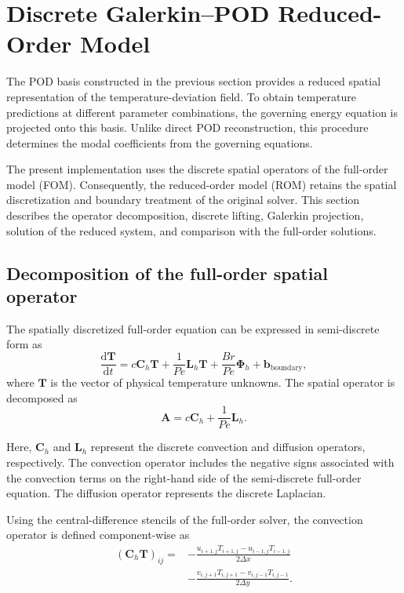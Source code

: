 \section{Discrete Galerkin--POD Reduced-Order Model}
\label{sec:discrete_galerkin_rom}

The POD basis constructed in the previous section provides a
reduced spatial representation of the temperature-deviation
field. To obtain temperature predictions at different parameter
combinations, the governing energy equation is projected onto
this basis. Unlike direct POD reconstruction, this procedure
determines the modal coefficients from the governing equations.

The present implementation uses the discrete spatial operators
of the full-order model (FOM). Consequently, the reduced-order
model (ROM) retains the spatial discretization and boundary
treatment of the original solver. This section describes the
operator decomposition, discrete lifting, Galerkin projection,
solution of the reduced system, and comparison with the
full-order solutions.

\subsection{Decomposition of the full-order spatial operator}

The spatially discretized full-order equation can be expressed
in semi-discrete form as
\begin{equation}
    \frac{\mathrm{d}\mathbf{T}}{\mathrm{d}t}
    =
    c\mathbf{C}_h\mathbf{T}
    +\frac{1}{Pe}\mathbf{L}_h\mathbf{T}
    +\frac{Br}{Pe}\boldsymbol{\Phi}_h
    +\mathbf{b}_{\mathrm{boundary}},
    \label{eq:fom_operator_decomposition}
\end{equation}
where $\mathbf{T}$ is the vector of physical temperature
unknowns. The spatial operator is decomposed as
\begin{equation}
    \boxed{
    \mathbf{A}
    =
    c\mathbf{C}_h+\frac{1}{Pe}\mathbf{L}_h.
    }
    \label{eq:full_order_operator}
\end{equation}

Here, $\mathbf{C}_h$ and $\mathbf{L}_h$ represent the discrete
convection and diffusion operators, respectively. The
convection operator includes the negative signs associated
with the convection terms on the right-hand side of the
semi-discrete full-order equation. The diffusion operator
represents the discrete Laplacian.

Using the central-difference stencils of the full-order solver,
the convection operator is defined component-wise as
\begin{align}
    (\mathbf{C}_h\mathbf{T})_{ij}
    ={}&
    -\frac{
    u_{i+1,j}T_{i+1,j}
    -u_{i-1,j}T_{i-1,j}
    }{2\Delta x}
    \nonumber\\
    &-
    \frac{
    v_{i,j+1}T_{i,j+1}
    -v_{i,j-1}T_{i,j-1}
    }{2\Delta y}.
    \label{eq:discrete_convection_operator}
\end{align}

